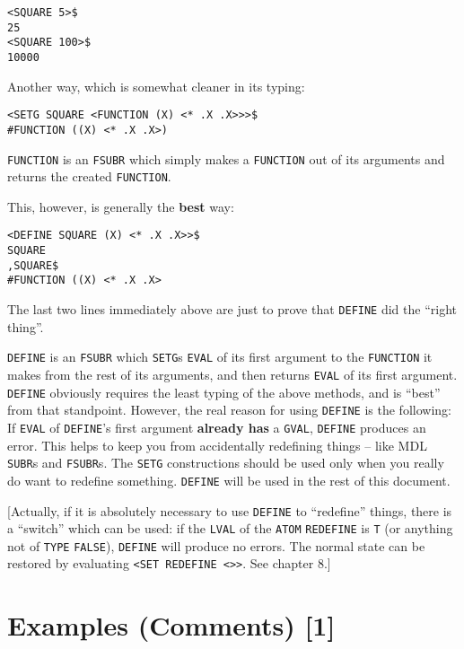 \documentclass[a4paper]{scrbook}
\begin{document}
\begin{verbatim}
<SQUARE 5>$
25
<SQUARE 100>$
10000
\end{verbatim}

Another way, which is somewhat cleaner in its typing:

\begin{verbatim}
<SETG SQUARE <FUNCTION (X) <* .X .X>>>$
#FUNCTION ((X) <* .X .X>)
\end{verbatim}

\texttt{FUNCTION} is an \texttt{FSUBR} which simply makes a \texttt{FUNCTION} out of its arguments and returns the created
\texttt{FUNCTION}.

This, however, is generally the \textbf{best} way:

\begin{verbatim}
<DEFINE SQUARE (X) <* .X .X>>$
SQUARE
,SQUARE$
#FUNCTION ((X) <* .X .X>
\end{verbatim}

The last two lines immediately above are just to prove that \texttt{DEFINE} did the ``right
thing''.

\texttt{DEFINE} is an \texttt{FSUBR} which \texttt{SETG}s \texttt{EVAL} of its first argument to the \texttt{FUNCTION} it
makes from the rest of its arguments, and then returns \texttt{EVAL} of its first argument. \texttt{DEFINE} obviously
requires the least typing of the above methods, and is ``best'' from that standpoint. However, the real reason for using
\texttt{DEFINE} is the following: If \texttt{EVAL} of \texttt{DEFINE}'s first argument \textbf{already has} a
\texttt{GVAL}, \texttt{DEFINE} produces an error. This helps to keep you from accidentally redefining things -- like MDL
\texttt{SUBR}s and \texttt{FSUBR}s. The \texttt{SETG} constructions should be used only when you really do want to redefine
something. \texttt{DEFINE} will be used in the rest of this document.

{[}Actually, if it is absolutely necessary to use \texttt{DEFINE} to ``redefine'' things, there is a ``switch'' which can
be used: if the \texttt{LVAL} of the \texttt{ATOM} \texttt{REDEFINE} is \texttt{T} (or
anything not of \texttt{TYPE} \texttt{FALSE}), \texttt{DEFINE} will produce no errors. The normal state can be restored by
evaluating \texttt{\textless{}SET\ REDEFINE\ \textless{}\textgreater{}\textgreater{}}. See chapter 8.{]}

\section{Examples (Comments) {[}1{]}}\label{examples-comments-1}
\end{document}
